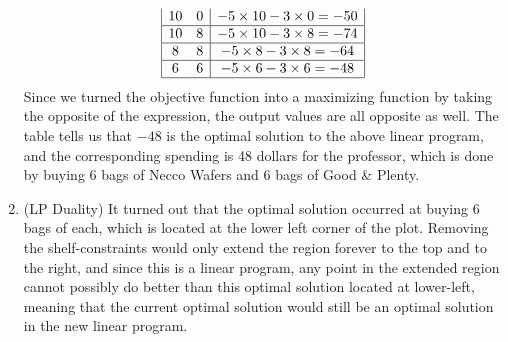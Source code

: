 \documentclass{article}
\begin{document}
\begin{enumerate}
$$\begin{array}{|cc|c|}
        10  & 0   & -5 \times 10 - 3 \times 0 = -50 \\
        \hline
        10  & 8   & -5 \times 10 - 3 \times 8 = -74 \\
        \hline
        8   & 8   & -5 \times 8 - 3 \times 8 = -64  \\
        \hline
        6   & 6   & -5 \times 6 - 3 \times 6 = -48  \\
        \hline
      \end{array}
    $$
    Since we turned the objective function into a maximizing function by taking the opposite of the expression, the output values are all opposite as well. The table tells us that $-48$ is the optimal solution to the above linear program, and the corresponding spending is 48 dollars for the professor, which is done by buying 6 bags of Necco Wafers and 6 bags of Good \& Plenty.

    \pagebreak

  \item (LP Duality)
    It turned out that the optimal solution occurred at buying 6 bags of each, which is located at the lower left corner of the plot. Removing the shelf-constraints would only extend the region forever to the top and to the right, and since this is a linear program, any point in the extended region cannot possibly do better than this optimal solution located at lower-left, meaning that the current optimal solution would still be an optimal solution in the new linear program.


\end{enumerate}
\end{document}

